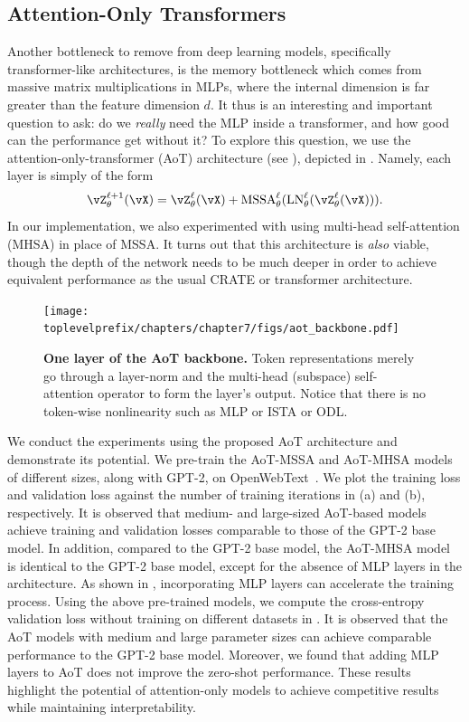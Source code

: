 \documentclass[../../book-main.tex]{subfiles}
\begin{document}
\subsection{Attention-Only Transformers} \label{sub:aot_experiments}

Another bottleneck to remove from deep learning models, specifically transformer-like architectures, is the memory bottleneck which comes from massive matrix multiplications in MLPs, where the internal dimension is far greater than the feature dimension \(d\). It thus is an interesting and important question to ask: do we \textit{really} need the MLP inside a transformer, and how good can the performance get without it? To explore this question, we use the attention-only-transformer (AoT) architecture (see ), depicted in . Namely, each layer is simply of the form 
\begin{equation}
    \vZ_{\theta}^{\ell + 1}(\vX) = \vZ_{\theta}^{\ell}(\vX) + \MSSA_{\theta}^{\ell}(\LN_{\theta}^{\ell}(\vZ_{\theta}^{\ell}(\vX))).
\end{equation}
In our implementation, we also experimented with using multi-head self-attention (MHSA) in place of MSSA. It turns out that this architecture is \textit{also} viable, though the depth of the network needs to be much deeper in order to achieve equivalent performance as the usual CRATE or transformer architecture. %

\begin{figure}[!htbp]
    \centering 
    \texttt{[image: \\toplevelprefix/chapters/chapter7/figs/aot\_backbone.pdf]}
    \caption{\small\textbf{One layer of the AoT backbone.} Token representations merely go through a layer-norm and the multi-head (subspace) self-attention operator to form the layer's output. Notice that there is no token-wise nonlinearity such as MLP or ISTA or ODL.}
    \label{fig:aot_backbone}
\end{figure}


We conduct the experiments using the proposed AoT architecture and demonstrate its potential. We pre-train the AoT-MSSA and AoT-MHSA models of different sizes, along with GPT-2, on OpenWebText~\citep{Gokaslan2019OpenWeb}. We plot the training loss and validation loss against the number of training iterations in (a) and (b), respectively. It is observed that medium- and large-sized AoT-based models achieve training and validation losses comparable to those of the GPT-2 base model. In addition, compared to the GPT-2 base model, the AoT-MHSA model is identical to the GPT-2 base model, except for the absence of MLP layers in the architecture. As shown in , incorporating MLP layers can accelerate the training process. Using the above pre-trained models, we compute the cross-entropy validation loss without training on different datasets in . It is observed that the AoT models with medium and large parameter sizes can achieve comparable performance to the GPT-2 base model. Moreover, we found that adding MLP layers to AoT does not improve the zero-shot performance. These results highlight the potential of attention-only models to achieve competitive results while maintaining interpretability.  
\end{document}
